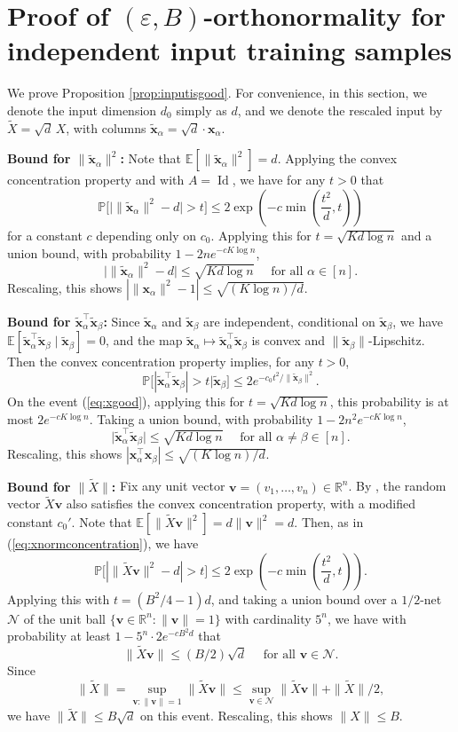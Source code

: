 \documentclass{article}
\theoremstyle{definition}
\newcommand{\R}{\mathbb{R}}
\newcommand{\N}{\mathcal{N}}
\newcommand{\E}{\mathbb{E}}
\newcommand{\Id}{\operatorname{Id}}
\newcommand{\x}{\mathbf{x}}
\renewcommand{\v}{\mathbf{v}}
\renewcommand{\a}{\alpha}
\renewcommand{\b}{\beta}
\newcommand{\eps}{\varepsilon}
\newcommand{\wX}{\widetilde{X}}
\renewcommand{\P}{\mathbb{P}}
\newcommand{\wx}{\tilde{\mathbf{x}}}
\newcommand{\1}{\mathbf{1}}
\begin{document}
\section{Proof of $(\eps,B)$-orthonormality for independent input
training samples}\label{appendix:inputisgood}
We prove Proposition \ref{prop:inputisgood}. For convenience, in this section,
we denote the input dimension $d_0$ simply as $d$, and we denote the rescaled
input by $\wX=\sqrt{d}\,X$, with columns $\wx_\a=\sqrt{d} \cdot \x_\a$. 

{\bf Bound for $\|\wx_\a\|^2$:}
Note that $\E[\|\wx_\a\|^2]=d$. Applying the convex concentration property
and \cite[Theorem 2.5]{adamczak2015note} with $A=\Id$, we have for any
$t>0$ that
\begin{equation}\label{eq:xnormconcentration}
\P\Big[\big|\|\wx_\a\|^2-d\big|>t\Big] \leq
2\exp\left(-c\min\left(\frac{t^2}{d},t\right)\right)
\end{equation}
for a constant $c$ depending only on $c_0$. Applying this for
$t=\sqrt{Kd\log n}$ and a union bound, with probability $1-2ne^{-cK\log n}$,
\begin{equation}\label{eq:xgood}
\Big|\|\wx_\a\|^2-d\Big| \leq \sqrt{Kd\log n} \quad
\text{ for all } \a \in [n].
\end{equation}
Rescaling, this shows $|\|\x_\a\|^2-1| \leq \sqrt{(K\log n)/d}$.

{\bf Bound for $\wx_\a^\top \wx_\b$:}
Since $\wx_\a$ and $\wx_\b$ are independent,
conditional on $\wx_\b$, we have $\E[\wx_\a^\top \wx_\b \mid \wx_\b]=0$, and
the map $\wx_\a \mapsto \wx_\a^\top \wx_\b$
is convex and $\|\wx_\b\|$-Lipschitz. Then the convex concentration property
implies, for any $t>0$,
\[\P\Big[|\wx_\a^\top \wx_\b|>t \Big|\wx_\b \Big] \leq
2e^{-c_0t^2/\|\wx_\b\|^2}.\]
On the event (\ref{eq:xgood}), applying this for $t=\sqrt{Kd\log n}$,
this probability is at most $2e^{-cK\log n}$.
Taking a union bound, with probability $1-2n^2e^{-cK\log n}$,
\[\Big|\wx_\a^\top \wx_\b\Big| \leq \sqrt{Kd\log n}
\quad \text{ for all } \a \neq \b \in [n].\]
Rescaling, this shows $|\x_\a^\top \x_\b| \leq \sqrt{(K\log n)/d}$.

{\bf Bound for $\|\wX\|$:} Fix any unit vector $\v=(v_1,\ldots,v_n) \in \R^n$.
By \cite[Lemma C.11]{kasiviswanathan2019restricted}, the random vector $\wX\v$
also satisfies the convex concentration property, with a modified constant
$c_0'$. Note that $\E[\|\wX\v\|^2]=d\|\v\|^2=d$. Then, as in
(\ref{eq:xnormconcentration}), we have
\[\P\Big[|\|\wX \v\|^2-d|>t\Big] \leq
2\exp\left(-c\min\left(\frac{t^2}{d},t\right)\right).\]
Applying this with $t=(B^2/4-1)d$,
and taking a union bound over a $1/2$-net $\N$
of the unit ball $\{\v \in \R^n:\|\v\|=1\}$ with cardinality $5^n$, we have
with probability at least $1-5^n \cdot 2e^{-cB^2d}$ that
\[\|\wX\v\| \leq (B/2)\sqrt{d} \quad \text{ for all } \v \in \N.\]
Since
\[\|\wX\|=\sup_{\v:\|\v\|=1} \|\wX\v\|
\leq \sup_{\v \in \N} \|\wX\v\|+\|\wX\|/2,\]
we have $\|\wX\| \leq B\sqrt{d}$ on this event. Rescaling, this shows $\|X\|
\leq B$.
\end{document}
